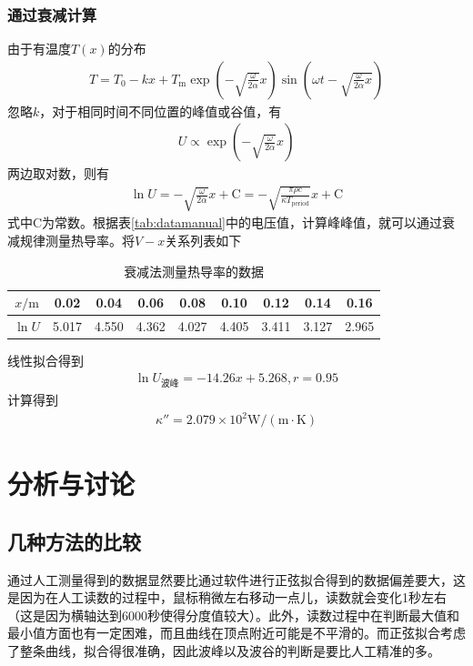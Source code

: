 \documentclass{ctexart}
\begin{document}
	\subsubsection{通过衰减计算}
	由于有温度$T(x)$的分布
	\begin{align}
		T=T_0-kx+T_\text{m}\exp{\left(-\sqrt{\frac{\omega}{2\alpha}}x\right)}\sin{\left(\omega t-\sqrt{\frac{\omega}{2\alpha}x}\right)}
		\label{eq:sj}
	\end{align}
	忽略$k$，对于相同时间不同位置的峰值或谷值，有
	\begin{align}
		U\propto \exp{\left(-\sqrt{\frac{\omega}{2\alpha}}x\right)}
	\end{align}
	两边取对数，则有
	\begin{align}
		\ln{U}=-\sqrt{\frac{\omega}{2\alpha}}x+\text{C}=-\sqrt{\frac{\pi\rho c}{\kappa T_\text{period}}}x+\text{C}
	\end{align}
	式中$\text{C}$为常数。根据表\ref{tab:datamanual}中的电压值，计算峰峰值，就可以通过衰减规律测量热导率。将$V-x$关系列表如下
	\begin{table}[H]
		\begin{center}
			\caption{衰减法测量热导率的数据}
			\begin{tabular}{c|cccccccc}
				$x/\mathrm{m}$&0.02&0.04&0.06&0.08&0.10&0.12&0.14&0.16\\
				\hline
				$\ln{U}$&5.017&4.550&4.362&4.027&4.405&3.411&3.127&2.965
			\end{tabular}
		\end{center}
	\end{table}
	线性拟合得到
	\begin{align}
		\ln{U}_{\text{波峰}}=-14.26x+5.268,r=0.95
	\end{align}
	计算得到
	\begin{align}
		\kappa''=2.079\times 10^2 \mathrm{W/(m\cdot K)}
	\end{align}
	\section{分析与讨论}
	\subsection{几种方法的比较}
	通过人工测量得到的数据显然要比通过软件进行正弦拟合得到的数据偏差要大，这是因为在人工读数的过程中，鼠标稍微左右移动一点儿，读数就会变化1秒左右（这是因为横轴达到6000秒使得分度值较大）。此外，读数过程中在判断最大值和最小值方面也有一定困难，而且曲线在顶点附近可能是不平滑的。而正弦拟合考虑了整条曲线，拟合得很准确，因此波峰以及波谷的判断是要比人工精准的多。
	
\end{document}
